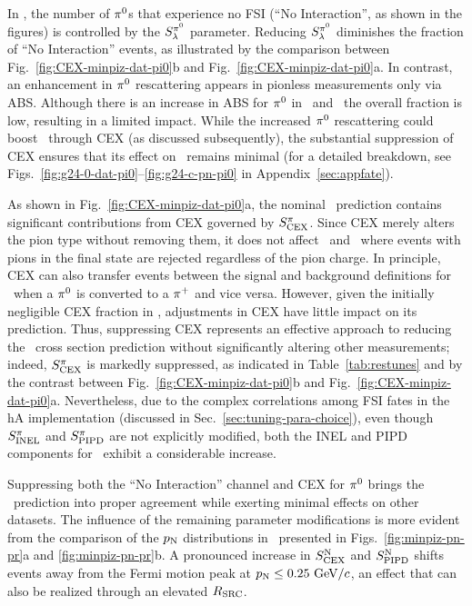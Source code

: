     In \minpiz, the number of $\pi^0$s that experience no FSI (``No Interaction'', as shown in the figures) is controlled by the $S_\lambda^{\pi^{0}}$ parameter. 
    Reducing $S_\lambda^{\pi^{0}}$ diminishes the fraction of ``No Interaction'' events, as illustrated by the comparison between Fig.~\ref{fig:CEX-minpiz-dat-pi0}b and Fig.~\ref{fig:CEX-minpiz-dat-pi0}a. 
    In contrast, an enhancement in $\pi^0$ rescattering appears in pionless measurements only via ABS. 
    Although there is an increase in ABS for $\pi^0$ in \ttkzpi\ and \minzpi\, the overall fraction is low, resulting in a limited impact. 
    While the increased $\pi^0$ rescattering could boost \ttkpip\ through CEX (as discussed subsequently), the substantial suppression of CEX ensures that its effect on \ttkpip\ remains minimal (for a detailed breakdown, see Figs.~\ref{fig:g24-0-dat-pi0}--\ref{fig:g24-c-pn-pi0} in Appendix~\ref{sec:appfate}). 

    As shown in Fig.~\ref{fig:CEX-minpiz-dat-pi0}a, the nominal \minpiz\ prediction contains significant contributions from CEX governed by $S_\textrm{CEX}^{\pi}$. 
    Since CEX merely alters the pion type without removing them, it does not affect \ttkzpi\ and \minzpi\, where events with pions in the final state are rejected regardless of the pion charge. 
    In principle, CEX can also transfer events between the signal and background definitions for \ttkpip\ when a $\pi^0$ is converted to a $\pi^+$ and vice versa. 
    However, given the initially negligible CEX fraction in \ttkpip, adjustments in CEX have little impact on its prediction. 
    Thus, suppressing CEX represents an effective approach to reducing the \minpiz\ cross section prediction without significantly altering other measurements; indeed, $S_\textrm{CEX}^{\pi}$ is markedly suppressed, as indicated in Table~\ref{tab:restunes} and by the contrast between Fig.~\ref{fig:CEX-minpiz-dat-pi0}b and Fig.~\ref{fig:CEX-minpiz-dat-pi0}a. 
    Nevertheless, due to the complex correlations among FSI fates in the hA implementation (discussed in Sec.~\ref{sec:tuning-para-choice}), even though $S_\textrm{INEL}^{\pi}$ and $S_\textrm{PIPD}^{\pi}$ are not explicitly modified, both the INEL and PIPD components for \minpiz\ exhibit a considerable increase.

    Suppressing both the ``No Interaction'' channel and CEX for $\pi^0$ brings the \minpiz\ prediction into proper agreement while exerting minimal effects on other datasets.  
    The influence of the remaining parameter modifications is more evident from the comparison of the $p_\textrm{N}$ distributions in \minpiz\ presented in Figs.~\ref{fig:minpiz-pn-pr}a and \ref{fig:minpiz-pn-pr}b. 
    A pronounced increase in $S_\textrm{CEX}^\textrm{N}$ and $S_\textrm{PIPD}^\textrm{N}$ shifts events away from the Fermi motion peak at $p_\textrm{N}\leq0.25~\textrm{GeV}/c$, an effect that can also be realized through an elevated $R_\textrm{SRC}$. 


